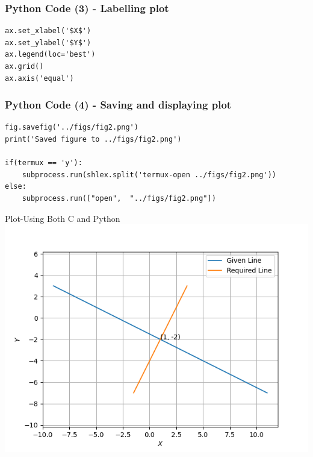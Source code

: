 \documentclass{beamer}
\begin{document}
\begin{frame}[fragile]
    \frametitle{Python Code (3) - Labelling plot}
    \begin{lstlisting}
ax.set_xlabel('$X$')
ax.set_ylabel('$Y$')
ax.legend(loc='best')
ax.grid() 
ax.axis('equal')
    \end{lstlisting}
\end{frame}

\begin{frame}[fragile]
    \frametitle{Python Code (4) - Saving and displaying plot}
    \begin{lstlisting}
fig.savefig('../figs/fig2.png')
print('Saved figure to ../figs/fig2.png')

if(termux == 'y'):
    subprocess.run(shlex.split('termux-open ../figs/fig2.png'))
else:
    subprocess.run(["open",  "../figs/fig2.png"])
\end{lstlisting}
\end{frame}

\begin{frame}{Plot-Using Both C and Python}
    \centering
    \includegraphics[width=\columnwidth, height=0.8\textheight, keepaspectratio]{../figs/fig2.png}     
\end{frame}
\end{document}
